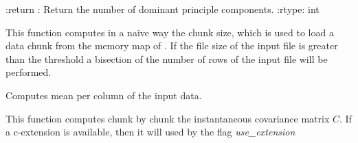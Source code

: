 \documentclass[letterpaper,10pt,english]{sphinxmanual}
\begin{document}
\begin{fulllineitems}
\begin{fulllineitems}
\begin{quote}
\begin{description}
\end{description}\end{quote}

:return : Return the number of dominant principle components.
:rtype: int

\end{fulllineitems}


\begin{fulllineitems}
\label{tica:Tica_PrincipleComp.TicaPrinComp.computeChunkSize}
This function computes in a naive way the chunk size, which is used to load a data chunk from the memory map
of .
If the file size of the input file is greater than the threshold a bisection
of the number of rows of the input file will be performed.

\end{fulllineitems}


\begin{fulllineitems}
\label{tica:Tica_PrincipleComp.TicaPrinComp.computeColMeans}
Computes mean per column of the input data.

\end{fulllineitems}


\begin{fulllineitems}
\label{tica:Tica_PrincipleComp.TicaPrinComp.computeCovariance}
This function computes chunk by chunk the instantaneous covariance matrix \(C\).
If a c-extension is available, then it will used by the flag \emph{use\_extension}

\end{fulllineitems}



\end{fulllineitems}
\end{document}
